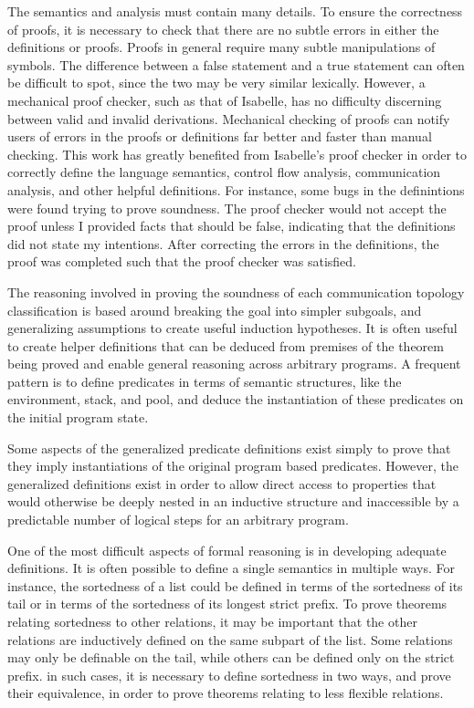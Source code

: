 \documentclass[10pt]{article}
\begin{document}
The semantics and analysis must contain many details. To ensure the
correctness of proofs, it is necessary to check that there are no subtle errors in either the 
definitions or proofs. Proofs in general require many subtle manipulations of symbols. The
difference between a false statement and a true statement can often be difficult to spot, since
the two may be very similar lexically. However, a mechanical proof checker, such as that of 
Isabelle, has no difficulty discerning between valid and invalid derivations.
Mechanical checking of proofs can notify users of errors in the proofs or definitions far better
and faster than manual checking. This work has greatly benefited from Isabelle's proof checker in
order to correctly define the language semantics, control flow analysis, communication analysis,
and other helpful definitions. For instance, some bugs in the
definintions were found trying to prove
soundness. The proof checker would not accept the proof unless I provided facts that
should be false, indicating that the definitions did not state my intentions.
After correcting the errors in the definitions, the proof was completed such that the proof
checker was satisfied.



The reasoning involved in proving the soundness of each communication topology classification
is based around breaking the goal into simpler subgoals, and generalizing assumptions to create
useful induction hypotheses.  It is often useful to
create helper definitions that can be deduced
from premises of the theorem being proved and enable
general reasoning across arbitrary programs.
A frequent pattern is to define
predicates in terms of semantic structures, like the environment, stack, and pool, and deduce 
the instantiation of these predicates on the initial program state. 

Some aspects of the generalized predicate definitions exist simply to prove that they imply
instantiations of the original program based predicates. However, the generalized
definitions exist in order to allow direct access to properties that would
otherwise be deeply nested
in an inductive structure and inaccessible by a predictable number of
logical steps for an arbitrary
program.

One of the most difficult aspects of formal reasoning is in developing adequate definitions.
It is often possible to define a single semantics in multiple ways.
For instance, the sortedness of a list could be defined in terms of the sortedness of its tail
or in terms of the sortedness of its longest strict prefix. To prove theorems relating
sortedness to other relations, it may be important that the other relations are inductively
defined on the same subpart of the list. Some relations may only be definable on the tail,
while others can be defined only on the strict prefix. in such cases, it is necessary to
define sortedness in two ways, and prove their equivalence, in order to prove theorems relating
to less flexible relations.
\end{document}
